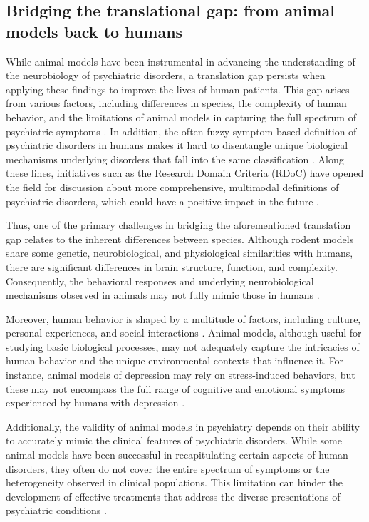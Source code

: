 \subsection{Bridging the translational gap: from animal models back to humans}

While animal models have been instrumental in advancing the understanding of the neurobiology of psychiatric disorders, a translation gap persists when applying these findings to improve the lives of human patients. This gap arises from various factors, including differences in species, the complexity of human behavior, and the limitations of animal models in capturing the full spectrum of psychiatric symptoms \cite{Baker2020RodentPromises, Gururajan2019TheResearch}. In addition, the often fuzzy symptom-based definition of psychiatric disorders in humans makes it hard to disentangle unique biological mechanisms underlying disorders that fall into the same classification \cite{Miranda2021SystematicSubtyping}. Along these lines, initiatives such as the Research Domain Criteria (RDoC) have opened the field for discussion about more comprehensive, multimodal definitions of psychiatric disorders, which could have a positive impact in the future \cite{Vilar2019TranslationalRDoC}.

Thus, one of the primary challenges in bridging the aforementioned translation gap relates to the inherent differences between species. Although rodent models share some genetic, neurobiological, and physiological similarities with humans, there are significant differences in brain structure, function, and complexity. Consequently, the behavioral responses and underlying neurobiological mechanisms observed in animals may not fully mimic those in humans \cite{Bale2019TheDisorders}.

Moreover, human behavior is shaped by a multitude of factors, including culture, personal experiences, and social interactions \cite{Soderlund2018RelevanceNeuropsychiatry}. Animal models, although useful for studying basic biological processes, may not adequately capture the intricacies of human behavior and the unique environmental contexts that influence it. For instance, animal models of depression may rely on stress-induced behaviors, but these may not encompass the full range of cognitive and emotional symptoms experienced by humans with depression \cite{vonMucke-Heim2022IntroducingMice}.

Additionally, the validity of animal models in psychiatry depends on their ability to accurately mimic the clinical features of psychiatric disorders. While some animal models have been successful in recapitulating certain aspects of human disorders, they often do not cover the entire spectrum of symptoms or the heterogeneity observed in clinical populations. This limitation can hinder the development of effective treatments that address the diverse presentations of psychiatric conditions \cite{Baker2020RodentPromises, Soderlund2018RelevanceNeuropsychiatry}.


